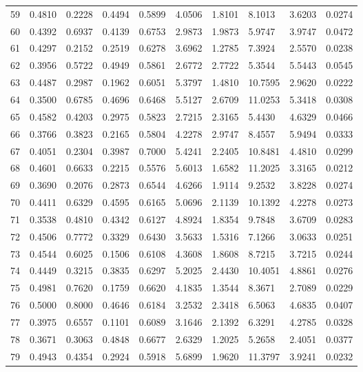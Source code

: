 \begin{longtable}{ p{}  p{}  p{}  p{}  p{} p{}  p{} p{} p{} p{}}
59	&	0.4810	&	0.2228	&	0.4494	&	0.5899	&	4.0506	&	1.8101	&	8.1013	&	3.6203	&	0.0274	\\
60	&	0.4392	&	0.6937	&	0.4139	&	0.6753	&	2.9873	&	1.9873	&	5.9747	&	3.9747	&	0.0472	\\
61	&	0.4297	&	0.2152	&	0.2519	&	0.6278	&	3.6962	&	1.2785	&	7.3924	&	2.5570	&	0.0238	\\
62	&	0.3956	&	0.5722	&	0.4949	&	0.5861	&	2.6772	&	2.7722	&	5.3544	&	5.5443	&	0.0545	\\
63	&	0.4487	&	0.2987	&	0.1962	&	0.6051	&	5.3797	&	1.4810	&	10.7595	&	2.9620	&	0.0222	\\
64	&	0.3500	&	0.6785	&	0.4696	&	0.6468	&	5.5127	&	2.6709	&	11.0253	&	5.3418	&	0.0308	\\
65	&	0.4582	&	0.4203	&	0.2975	&	0.5823	&	2.7215	&	2.3165	&	5.4430	&	4.6329	&	0.0466	\\
66	&	0.3766	&	0.3823	&	0.2165	&	0.5804	&	4.2278	&	2.9747	&	8.4557	&	5.9494	&	0.0333	\\
67	&	0.4051	&	0.2304	&	0.3987	&	0.7000	&	5.4241	&	2.2405	&	10.8481	&	4.4810	&	0.0299	\\
68	&	0.4601	&	0.6633	&	0.2215	&	0.5576	&	5.6013	&	1.6582	&	11.2025	&	3.3165	&	0.0212	\\
69	&	0.3690	&	0.2076	&	0.2873	&	0.6544	&	4.6266	&	1.9114	&	9.2532	&	3.8228	&	0.0274	\\
70	&	0.4411	&	0.6329	&	0.4595	&	0.6165	&	5.0696	&	2.1139	&	10.1392	&	4.2278	&	0.0273	\\
71	&	0.3538	&	0.4810	&	0.4342	&	0.6127	&	4.8924	&	1.8354	&	9.7848	&	3.6709	&	0.0283	\\
72	&	0.4506	&	0.7772	&	0.3329	&	0.6430	&	3.5633	&	1.5316	&	7.1266	&	3.0633	&	0.0251	\\
73	&	0.4544	&	0.6025	&	0.1506	&	0.6108	&	4.3608	&	1.8608	&	8.7215	&	3.7215	&	0.0244	\\
74	&	0.4449	&	0.3215	&	0.3835	&	0.6297	&	5.2025	&	2.4430	&	10.4051	&	4.8861	&	0.0276	\\
75	&	0.4981	&	0.7620	&	0.1759	&	0.6620	&	4.1835	&	1.3544	&	8.3671	&	2.7089	&	0.0229	\\
76	&	0.5000	&	0.8000	&	0.4646	&	0.6184	&	3.2532	&	2.3418	&	6.5063	&	4.6835	&	0.0407	\\
77	&	0.3975	&	0.6557	&	0.1101	&	0.6089	&	3.1646	&	2.1392	&	6.3291	&	4.2785	&	0.0328	\\
78	&	0.3671	&	0.3063	&	0.4848	&	0.6677	&	2.6329	&	1.2025	&	5.2658	&	2.4051	&	0.0377	\\
79	&	0.4943	&	0.4354	&	0.2924	&	0.5918	&	5.6899	&	1.9620	&	11.3797	&	3.9241	&	0.0232	\\

\end{longtable}
